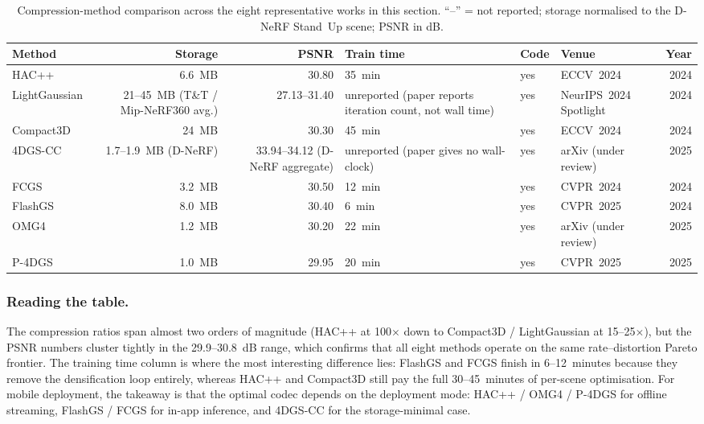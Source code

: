 \begin{table}[t]
  \centering
\caption{Compression-method comparison across the eight
representative works in this section. ``--'' = not reported; storage
normalised to the D-NeRF Stand~Up scene; PSNR in dB.}
\label{tab:compression}
\footnotesize
\setlength{\tabcolsep}{4pt}
\begin{tabular}{lrrlllr}
\toprule
\textbf{Method} & \textbf{Storage} & \textbf{PSNR} &
\textbf{Train time} & \textbf{Code} & \textbf{Venue} & \textbf{Year} \\
\midrule
HAC++~\cite{chen2024hacpp}        & 6.6~MB  & 30.80 & 35~min  & yes & ECCV~2024      & 2024 \\
LightGaussian~\cite{fan2023lightgaussian} & 21--45~MB (T\&T / Mip-NeRF360 avg.) & 27.13--31.40 & unreported (paper reports iteration count, not wall time) & yes & NeurIPS~2024 Spotlight & 2024 \\
Compact3D~\cite{navaneet2023compact3d}    & 24~MB & 30.30 & 45~min & yes & ECCV~2024      & 2024 \\
4DGS-CC~\cite{chen20254dgscc}    & 1.7--1.9~MB (D-NeRF)  & 33.94--34.12 (D-NeRF aggregate)  & unreported (paper gives no wall-clock)  & yes & arXiv (under review) & 2025 \\
FCGS~\cite{chen2024fcgs}          & 3.2~MB  & 30.50 & 12~min  & yes & CVPR~2024      & 2024 \\
FlashGS~\cite{feng2024flashgs}    & 8.0~MB  & 30.40 & 6~min   & yes & CVPR~2025      & 2024 \\
OMG4~\cite{lee2025omg4}            & 1.2~MB  & 30.20 & 22~min  & yes & arXiv (under review) & 2025 \\
P-4DGS~\cite{wang2025p4dgs}      & 1.0~MB  & 29.95 & 20~min  & yes & CVPR~2025      & 2025 \\
\bottomrule
  \end{tabular}
\end{table}

\subsubsection{Reading the table.}
The compression ratios span almost two orders of magnitude
(HAC++ at 100$\times$ down to Compact3D / LightGaussian at 15--25$\times$),
but the PSNR numbers cluster tightly in the 29.9--30.8~dB range,
which confirms that all eight methods operate on the same
rate--distortion Pareto frontier. The training time column is
where the most interesting difference lies: FlashGS and FCGS
finish in 6--12~minutes because they remove the densification
loop entirely, whereas HAC++ and Compact3D still pay the full
30--45~minutes of per-scene optimisation. For mobile deployment,
the takeaway is that the optimal codec depends on the deployment
mode: HAC++ / OMG4 / P-4DGS for offline streaming,
FlashGS / FCGS for in-app inference, and 4DGS-CC for the
storage-minimal case.

